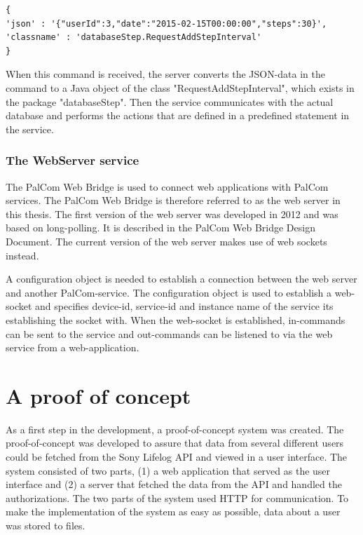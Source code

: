 \documentclass{cslthse-msc}
\begin{document}
\begin{verbatim}
{
'json' : '{"userId":3,"date":"2015-02-15T00:00:00","steps":30}',
'classname'	: 'databaseStep.RequestAddStepInterval'
}
\end{verbatim}  

When this command is received, the server converts the JSON-data in the command to a Java object of the class "RequestAddStepInterval", which exists in the package "databaseStep". Then the service communicates with the actual database and performs the actions that are defined in a predefined statement in the service. 
	
\subsubsection{The WebServer service}
\label{sec:webserver}

The PalCom Web Bridge is used to connect web applications with PalCom services.  The PalCom Web Bridge is therefore referred to as the web server in this thesis. The first version of the web server was developed in 2012 and was based on long-polling. It is described in the PalCom Web Bridge Design Document\cite{XXXXXXNULL}. The current version of the web server makes use of web sockets instead. 

A configuration object is needed to establish a connection between the web server and another PalCom-service. The configuration object is used to establish a web-socket and specifies device-id, service-id and instance name of the service its establishing the socket with. When the web-socket is established, in-commands can be sent to the service and out-commands can be listened to via the web service from a web-application.


\section{A proof of concept}

As a first step in the development, a proof-of-concept system was created. The proof-of-concept was developed to assure that data from several different users could be fetched from the Sony Lifelog API and viewed in a user interface. The system consisted of two parts, (1) a web application that served as the user interface and (2) a server that fetched the data from the API and handled the authorizations. The two parts of the system used HTTP for communication. To make the implementation of  the system as easy as possible, data about a user was stored to files. 
\end{document}
